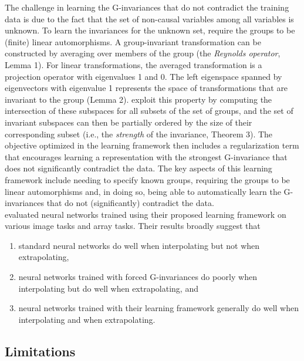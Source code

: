 The challenge in learning the G-invariances that do not contradict the training data is due to the fact that the set of non-causal variables among all variables is unknown. To learn the invariances for the unknown set, \citeauthor{Mouli:2021} require the groups to be (finite) linear automorphisms. A group-invariant transformation can be constructed by averaging over members of the group (the \textit{Reynolds operator}, Lemma 1). For linear transformations, the averaged transformation is a projection operator with eigenvalues 1 and 0. The left eigenspace spanned by eigenvectors with eigenvalue 1 represents the space of transformations that are invariant to the group (Lemma 2). \citeauthor{Mouli:2021} exploit this property by computing the intersection of these subspaces for all subsets of the set of groups, and the set of invariant subspaces can then be partially ordered by the size of their corresponding subset (i.e., the \textit{strength} of the invariance, Theorem 3). The objective optimized in the learning framework then includes a regularization term that encourages learning a representation with the strongest G-invariance that does not significantly contradict the data. The key aspects of this learning framework include needing to specify known groups, requiring the groups to be linear automorphisms and, in doing so, being able to automatically learn the G-invariances that do not (significantly) contradict the data.
\\

\citeauthor{Mouli:2021} evaluated neural networks trained using their proposed learning framework on various image tasks and array tasks. Their results broadly suggest that
\begin{enumerate}

\item
standard neural networks do well when interpolating but not when extrapolating,

\item
neural networks trained with forced G-invariances do poorly when interpolating but do well when extrapolating, and

\item
neural networks trained with their learning framework generally do well when interpolating and when extrapolating.

\end{enumerate}

 
\subsection{Limitations}

